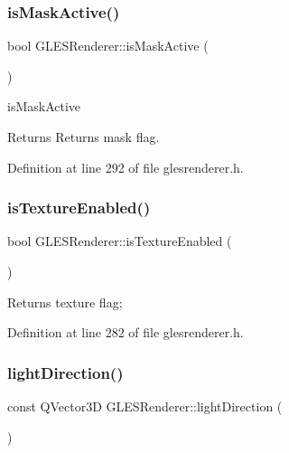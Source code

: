 \subsubsection{\texorpdfstring{isMaskActive()}{isMaskActive()}}
{\footnotesize\ttfamily bool G\+L\+E\+S\+Renderer\+::is\+Mask\+Active (\begin{DoxyParamCaption}{ }\end{DoxyParamCaption})\hspace{0.3cm}{\ttfamily [inline]}}



is\+Mask\+Active 

\begin{DoxyReturn}{Returns}
Returns mask flag. 
\end{DoxyReturn}


Definition at line 292 of file glesrenderer.\+h.

\mbox{\label{class_g_l_e_s_renderer_afedd8e9ef1c5804d070f3c79baa15439}} 
\subsubsection{\texorpdfstring{isTextureEnabled()}{isTextureEnabled()}}
{\footnotesize\ttfamily bool G\+L\+E\+S\+Renderer\+::is\+Texture\+Enabled (\begin{DoxyParamCaption}{ }\end{DoxyParamCaption})\hspace{0.3cm}{\ttfamily [inline]}}

Returns texture flag; 

Definition at line 282 of file glesrenderer.\+h.

\mbox{\label{class_g_l_e_s_renderer_a12a75a5ea065e69ad3476344e59f5909}} 
\subsubsection{\texorpdfstring{lightDirection()}{lightDirection()}}
{\footnotesize\ttfamily const Q\+Vector3D G\+L\+E\+S\+Renderer\+::light\+Direction (\begin{DoxyParamCaption}{ }\end{DoxyParamCaption})\hspace{0.3cm}{\ttfamily [inline]}}

